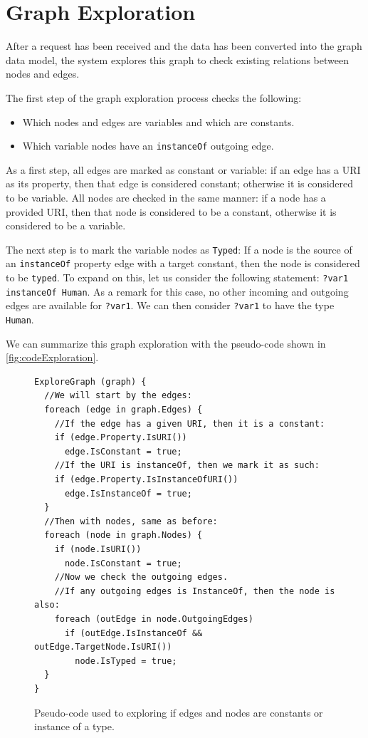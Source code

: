 
\section{Graph Exploration}
\label{chap:graph_exploration}

After a request has been received and the data has been converted into the graph data model, the system explores this graph to check existing relations between nodes and edges. 

The first step of the graph exploration process checks the following:
\begin{itemize}
    \item Which nodes and edges are variables and which are constants.
    \item Which variable nodes have an \texttt{instanceOf} outgoing edge.
\end{itemize}

As a first step, all edges are marked as constant or variable: 
if an edge has a URI as its property, then that edge is considered constant; otherwise it is considered to be variable. 
All nodes are checked in the same manner: if a node has a provided URI, then that node is considered to be a constant, otherwise it is considered to be a variable. 

The next step is to mark the variable nodes as \texttt{Typed}:
If a node is the source of an \texttt{instanceOf} property edge with a target constant, then the node is considered to be \texttt{typed}. To expand on this, let us consider the following statement: \texttt{?var1 instanceOf Human}. As a remark for this case, no other incoming and outgoing edges are available for \texttt{?var1}. We can then consider \texttt{?var1} to have the type \texttt{Human}.

We can summarize this graph exploration with the pseudo-code shown in \autoref{fig:codeExploration}.
\begin{figure}[H]
\begin{verbatim}
ExploreGraph (graph) {
  //We will start by the edges:
  foreach (edge in graph.Edges) {
    //If the edge has a given URI, then it is a constant:
    if (edge.Property.IsURI())
      edge.IsConstant = true;
    //If the URI is instanceOf, then we mark it as such:
    if (edge.Property.IsInstanceOfURI())
      edge.IsInstanceOf = true;
  }
  //Then with nodes, same as before:
  foreach (node in graph.Nodes) {
    if (node.IsURI())
      node.IsConstant = true;
    //Now we check the outgoing edges.
    //If any outgoing edges is InstanceOf, then the node is also:
    foreach (outEdge in node.OutgoingEdges)
      if (outEdge.IsInstanceOf && outEdge.TargetNode.IsURI())
        node.IsTyped = true;
  }
}
\end{verbatim}
\caption{Pseudo-code used to exploring if edges and nodes are constants or instance of a type.}
\label{fig:codeExploration}
\end{figure}

